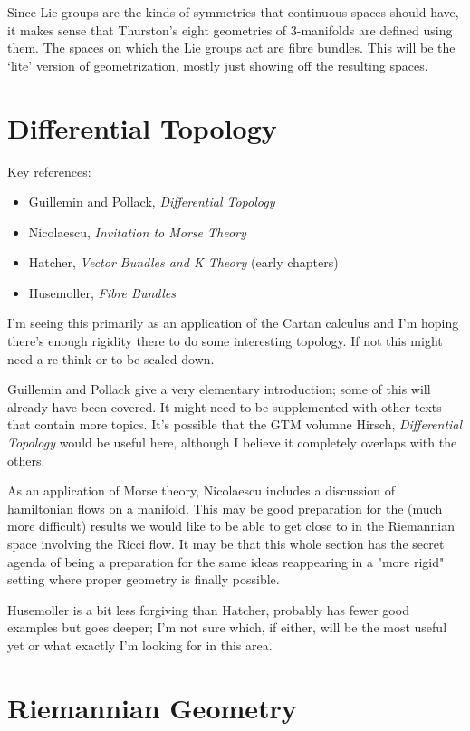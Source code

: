 \documentclass[article]{article}
\begin{document}
Since Lie groups are the kinds of symmetries that continuous spaces should have, it makes sense that Thurston's eight geometries of 3-manifolds are defined using them. The spaces on which the Lie groups act are fibre bundles. This will be the `lite' version of geometrization, mostly just showing off the resulting spaces.

\section{Differential Topology}

Key references:
\begin{itemize}
	\item{Guillemin and Pollack, \textit{Differential Topology}}
	\item{Nicolaescu, \textit{Invitation to Morse Theory}}
	\item{Hatcher, \textit{Vector Bundles and K Theory} (early chapters)}
	\item{Husemoller, \textit{Fibre Bundles}}
\end{itemize}

I'm seeing this primarily as an application of the Cartan calculus and I'm hoping there's enough rigidity there to do some interesting topology. If not this might need a re-think or to be scaled down.

Guillemin and Pollack give a very elementary introduction; some of this will already have been covered. It might need to be supplemented with other texts that contain more topics. It's possible that the GTM volumne Hirsch, \textit{Differential Topology} would be useful here, although I believe it completely overlaps with the others.

As an application of Morse theory, Nicolaescu includes a discussion of hamiltonian flows on a manifold. This may be good preparation for the (much more difficult) results we would like to be able to get close to in the Riemannian space involving the Ricci flow. It may be that this whole section has the secret agenda of being a preparation for the same ideas reappearing in a "more rigid" setting where proper geometry is finally possible.

Husemoller is a bit less forgiving than Hatcher, probably has fewer good examples but goes deeper; I'm not sure which, if either, will be the most useful yet or what exactly I'm looking for in this area.

\section{Riemannian Geometry}
\end{document}

